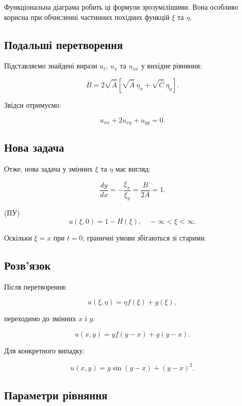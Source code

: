\documentclass[
  ukrainian,
]{article}
\begin{document}
Функціональна діаграма робить ці формули зрозумілішими. Вона особливо
корисна при обчисленні частинних похідних функцій \(\xi\) та \(\eta\).

\subsection{Подальші
перетворення}\label{ux43fux43eux434ux430ux43bux44cux448ux456-ux43fux435ux440ux435ux442ux432ux43eux440ux435ux43dux43dux44f}

Підставляємо знайдені вирази \(u_t\), \(u_x\) та \(u_{xx}\) у вихідне
рівняння:

\[
\overline{B} = 2\sqrt{\overline{A}} \left[ \sqrt{\overline{A}}\, \eta_x + \sqrt{\overline{C}}\, \eta_y \right].
\]

Звідси отримуємо:

\[
u_{xx} + 2u_{xy} + u_{yy} = 0.
\]

\subsection{Нова
задача}\label{ux43dux43eux432ux430-ux437ux430ux434ux430ux447ux430}

Отже, нова задача у змінних \(\xi\) та \(\eta\) має вигляд:

\[
\frac{dy}{dx} = -\frac{\xi_x}{\xi_y} = \frac{B}{2A} = 1.
\]

(ПУ) \[
u(\xi, 0) = 1 - H(\xi), \quad -\infty < \xi < \infty.
\]

Оскільки \(\xi = x\) при \(t = 0\), граничні умови збігаються зі
старими.

\subsection{Розв'язок}\label{ux440ux43eux437ux432ux44fux437ux43eux43a}

Після перетворення:

\[
u(\xi, \eta) = \eta f(\xi) + g(\xi),
\]

переходимо до змінних \(x\) і \(y\):

\[
u(x, y) = y f(y - x) + g(y - x).
\]

Для конкретного випадку:

\[
u(x, y) = y \sin(y - x) + (y - x)^2.
\]

\subsection{Параметри
рівняння}\label{ux43fux430ux440ux430ux43cux435ux442ux440ux438-ux440ux456ux432ux43dux44fux43dux43dux44f}
\end{document}

